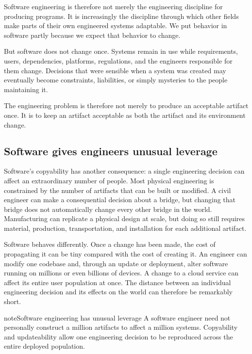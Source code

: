 Software engineering is therefore not merely the engineering discipline for producing programs. It is
increasingly the discipline through which other fields make parts of their own engineered systems
adaptable. We put behavior in software partly because we expect that behavior to change.

But software does not change once. Systems remain in use while requirements, users, dependencies,
platforms, regulations, and the engineers responsible for them change. Decisions that were sensible
when a system was created may eventually become constraints, liabilities, or simply mysteries to the
people maintaining it.

The engineering problem is therefore not merely to produce an acceptable artifact once. It is to keep
an artifact acceptable as both the artifact and its environment change.

\subsection{Software gives engineers unusual leverage}\label{sec-leverage}

Software's copyability has another consequence: a single engineering decision can affect an
extraordinary number of people. Most physical engineering is constrained by the number of artifacts
that can be built or modified. A
civil engineer can make a consequential decision about a bridge, but changing that bridge does not
automatically change every other bridge in the world. Manufacturing can replicate a physical design at
scale, but doing so still requires material, production, transportation, and installation for each
additional artifact.

Software behaves differently. Once a change has been made, the cost of propagating it can be tiny
compared with the cost of creating it. An engineer can modify one codebase and, through an update or
deployment, alter software running on millions or even billions of devices. A change to a cloud service
can affect its entire user population at once. The distance between an individual engineering decision
and its effects on the world can therefore be remarkably short.

\begin{bookbox}{note}{Software engineering has unusual leverage} %
A software engineer need not personally construct a million artifacts to affect a million systems.
Copyability and updateability allow one engineering decision to be reproduced across the entire deployed
population.
\end{bookbox}

